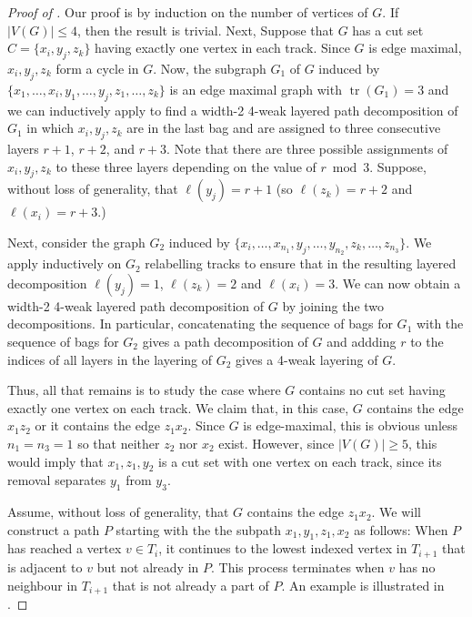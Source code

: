 \documentclass{patmorin}
\DeclareMathOperator{\tr}{tr}
\begin{document}
\begin{proof}[Proof of ]
  Our proof is by induction on the number of vertices of $G$.  If
  $|V(G)|\le 4$, then the result is trivial.  Next, Suppose that $G$ has
  a cut set $C=\{x_i,y_j,z_k\}$ having exactly one vertex in each track.
  Since $G$ is edge maximal, $x_i,y_j,z_k$ form a cycle in $G$.  Now,
  the subgraph $G_1$ of $G$ induced by $\{x_1,\ldots,x_i, y_1,\ldots,y_j,
  z_1,\ldots,z_k\}$ is an edge maximal graph with $\tr(G_1)=3$ and we
  can inductively apply  to find a width-2 4-weak layered
  path decomposition of $G_1$ in which $x_i,y_j,z_k$ are in the last bag
  and are assigned to three consecutive layers $r+1$, $r+2$, and $r+3$.
  Note that there are three possible assignments of $x_i,y_j,z_k$ to
  these three layers depending on the value of $r\bmod 3$.  Suppose,
  without loss of generality, that $\ell(y_j)=r+1$ (so $\ell(z_k)=r+2$
  and $\ell(x_i)=r+3$.)

  Next, consider the graph $G_2$ induced by
  $\{x_i,\ldots,x_{n_1},y_j,\ldots,y_{n_2},z_k,\ldots,z_{n_3}\}$.
  We apply  inductively on $G_2$ relabelling tracks to
  ensure that in the resulting layered decomposition $\ell(y_j)=1$,
  $\ell(z_k)=2$ and $\ell(x_i)=3$.   We can now obtain a width-2 4-weak
  layered path decomposition of $G$ by joining the two decompositions.
  In particular,  concatenating the sequence of bags for $G_1$ with
  the sequence of bags for $G_2$ gives a path decomposition of $G$
  and addding $r$ to the indices of all layers in the layering of $G_2$
  gives a 4-weak layering of $G$.

  Thus, all that remains is to study the case where $G$ contains no cut
  set having exactly one vertex on each track.  We claim that, in this
  case, $G$ contains the edge $x_1z_2$ or it contains the edge $z_1x_2$.
  Since $G$ is edge-maximal, this is obvious unless $n_1=n_3=1$ so
  that neither $z_2$ nor $x_2$ exist.  However, since $|V(G)|\ge 5$,
  this would imply that $x_1,z_1,y_2$ is a cut set with one vertex on
  each track, since its removal separates $y_1$ from $y_3$.

  Assume, without loss of generality, that $G$ contains the edge $z_1x_2$.
  We will construct a path $P$
  starting with the the subpath $x_1,y_1,z_1,x_2$ as follows: When $P$
  has reached a vertex $v\in T_i$, it continues to the lowest indexed
  vertex in $T_{i+1}$ that is adjacent to $v$ but not already in $P$. This
  process terminates when $v$ has no neighbour in $T_{i+1}$ that is not
  already a part of $P$.  An example is illustrated in .


\end{proof}
\end{document}
